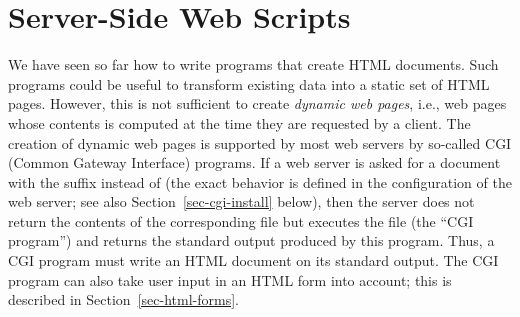 \section{Server-Side Web Scripts}

We have seen so far how to write programs that create
HTML documents.
Such programs could be useful to transform existing data into a static
set of HTML pages.
However, this is not sufficient to create
\emph{dynamic web pages}, i.e., web pages whose contents
is computed at the time they are requested by a client.
The creation of dynamic web pages is supported by most web servers
by so-called CGI (Common Gateway Interface) programs.
If a web server is asked for a document with the suffix 
instead of  (the exact behavior is defined in the configuration
of the web server; see also Section~\ref{sec-cgi-install} below),
then the server does not return
the contents of the corresponding file but executes the file
(the ``CGI program'') and returns the standard output produced
by this program. Thus, a CGI program must write an HTML document
on its standard output. The CGI program can also take user input
in an HTML form into account; this is described in
Section~\ref{sec-html-forms}.

